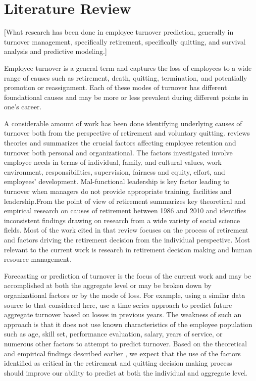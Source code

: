 \documentclass[12pt,letterpaper]{article}
\begin{document}

\section{Literature Review}

[What research has been done in employee turnover prediction, generally in turnover management, specifically retirement, specifically quitting, and survival analysis and predictive modeling.]


Employee turnover is a general term and captures the loss of employees to a wide range of causes such as retirement, death, quitting, termination, and potentially promotion or reassignment. Each of these modes of turnover has different foundational causes and may be more or less prevalent during different points in one's career.

A considerable amount of work has been done identifying underlying causes of turnover both from the perspective of retirement and voluntary quitting. \citet{rainlall2004} reviews theories and summarizes the crucial factors affecting employee retention and turnover both personal and organizational.  The factors investigated involve employee needs in terms of individual, family, and cultural values, work environment, responsibilities, supervision, fairness and equity, effort, and employees' development.  Mal-functional leadership is key factor leading to turnover when managers do not provide appropriate training, facilities and leadership.From the point of view of retirement \citet{Wang2010} summarizes key theoretical and empirical research on causes of retirement between 1986 and 2010 and identifies inconsistent findings drawing on research from a wide variety of social science fields. Most of the work cited in that review focuses on the process of retirement and factors driving the retirement decision from the individual perspective.  Most relevant to the current work is research in retirement decision making and human resource management.


Forecasting or prediction of turnover is the focus of the current work and may be accomplished at both the aggregate level or may be broken down by organizational factors or by the mode of loss.  For example, using a similar data source to that considered here, \citet{zhu2015} use a time series approach to predict future aggregate turnover based on losses in previous years.  The weakness of such an approach is that it does not use known characteristics of the employee population such as age, skill set, performance evaluation, salary, years of service, or numerous other factors to attempt to predict turnover.  Based on the theoretical and empirical findings described earlier \citep{rainlall2004,Wang2010}, we expect that the use of the factors identified as critical in the retirement and quitting decision making process should improve our ability to predict at both the individual and aggregate level.
\end{document}
